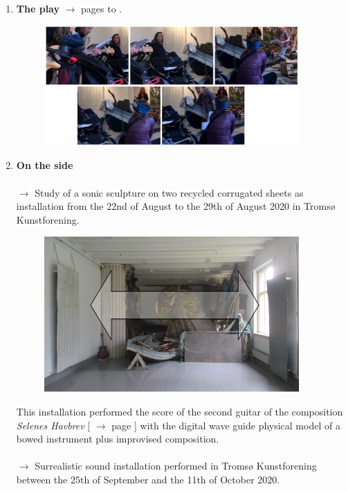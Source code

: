 \begin{enumerate}
\item \textbf{The play} $\rightarrow$ pages \pageref{shtp1} to \pageref{shtp2}. 
\begin{figure}[H]
\hfill \includegraphics[width=0.92\textwidth]{mp/img/img3}
\end{figure} 
\item \textbf{On the side} \\ \\ 
$\rightarrow$ Study of a sonic sculpture on two recycled corrugated sheets as installation from the 22nd of August to the 29th of August 2020 in Troms\o{} Kunstforening.
\begin{figure}[H]
\hfill \includegraphics[width=0.92\textwidth]{mp/img/img4}
\end{figure}
This installation performed the score of the second guitar of the composition \textsl{Selenes Havbrev} [ $\rightarrow$ page \pageref{sh} ] with the digital wave guide physical model of a bowed instrument plus improvised composition. \\ \\
$\rightarrow$ Surrealistic sound installation performed in Troms\o{} Kunstforening between the 25th of September and the 11th of October 2020. 

\end{enumerate}
